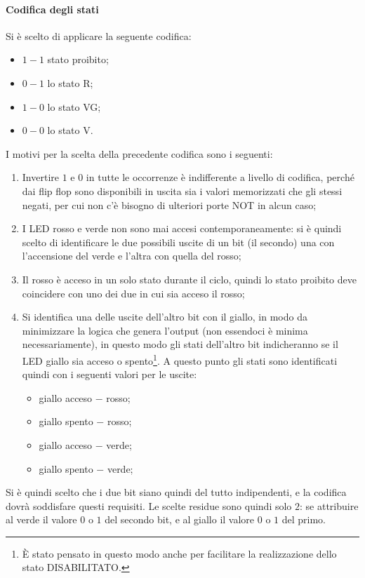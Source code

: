 \documentclass[a4paper,10pt]{article}
\begin{document}
\paragraph{Codifica degli stati} Si è scelto di applicare la seguente codifica:
\begin{itemize}
	\item $ 1-1 $ stato proibito;
	\item $ 0-1 $ lo stato R;
	\item $ 1-0 $ lo stato VG;
	\item $ 0-0 $ lo stato V.
\end{itemize}
I motivi per la scelta della precedente codifica sono i seguenti:
\begin{enumerate}
	\item Invertire $ 1 $ e $ 0 $ in tutte le occorrenze è indifferente a livello di codifica, perché dai flip flop sono disponibili in uscita sia i valori memorizzati che gli stessi negati, per cui non c'è bisogno di ulteriori porte NOT in alcun caso;
	\item I LED rosso e verde non sono mai accesi contemporaneamente: si è quindi scelto di identificare le due possibili uscite di un bit (il secondo) una con l'accensione del verde e l'altra con quella del rosso;
	\item Il rosso è acceso in un solo stato durante il ciclo, quindi lo stato proibito deve coincidere con uno dei due in cui sia acceso il rosso;
	\item Si identifica una delle uscite dell'altro bit con il giallo, in modo da minimizzare la logica che genera l'output (non essendoci è minima necessariamente), in questo modo gli stati dell'altro bit indicheranno se il LED giallo sia acceso o spento\footnote{\`E stato pensato in questo modo anche per facilitare la realizzazione dello stato DISABILITATO.}. A questo punto gli stati sono identificati quindi con i seguenti valori per le uscite:
	\begin{itemize}
		\item giallo acceso $ - $ rosso;
		\item giallo spento $ - $ rosso;
		\item giallo acceso $ - $ verde;
		\item giallo spento $ - $ verde;
	\end{itemize}
\end{enumerate}
Si è quindi scelto che i due bit siano quindi del tutto indipendenti, e la codifica dovrà soddisfare questi requisiti. Le scelte residue sono quindi solo $ 2 $: se attribuire al verde il valore $ 0 $ o $ 1 $ del secondo bit, e al giallo il valore $ 0 $ o $ 1 $ del primo.
\end{document}
